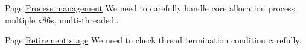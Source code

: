 \label{todo__todo000002}
\hypertarget{todo__todo000002}{}
 
\begin{DoxyDescription}
\item[Page \hyperlink{process}{Process management} ]We need to carefully handle core allocation process. multiple x86s, multi-\/threaded.. 
\end{DoxyDescription}

\label{todo__todo000003}
\hypertarget{todo__todo000003}{}
 
\begin{DoxyDescription}
\item[Page \hyperlink{retire}{Retirement stage} ]We need to check thread termination condition carefully. 
\end{DoxyDescription}